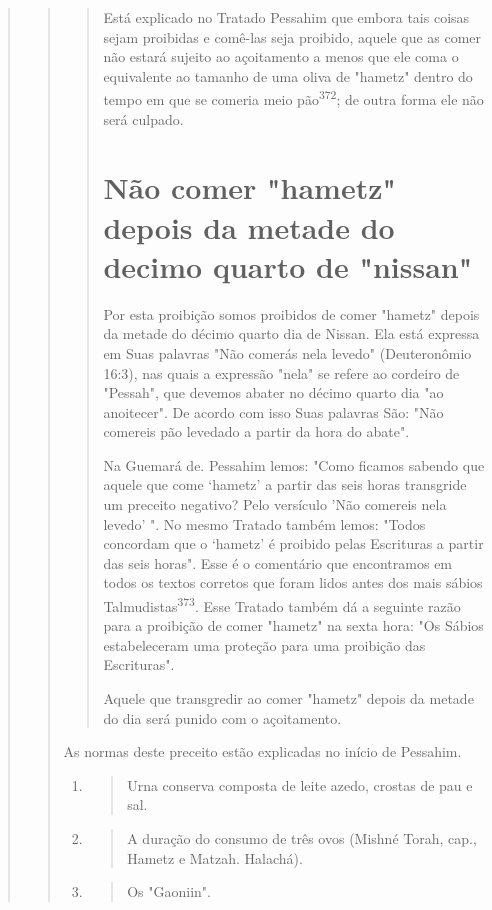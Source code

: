 \begin{quote}
\begin{quote}
\begin{quote}
Está explicado no Tratado Pessahim que embora tais coisas sejam
proibidas e comê-las seja proibido, aquele que as comer não estará
sujeito ao açoitamento a menos que ele coma o equivalente ao tamanho de
uma oliva de "hametz" dentro do tempo em que se comeria meio
pão\textsuperscript{372}; de outra forma ele não será culpado.

\section{Não comer "hametz" depois da metade do decimo quarto de "nissan"}

Por esta proibição somos proibidos de comer "hametz" depois da metade do
décimo quarto dia de Nissan. Ela está expressa em Suas palavras "Não
comerás nela levedo" (Deuteronômio 16:3), nas quais a expressão "nela"
se refere ao cordeiro de "Pessah", que devemos abater no décimo quarto
dia "ao anoitecer". De acordo com isso Suas palavras São: "Não comereis
pão leveda­do a partir da hora do abate".

Na Guemará de. Pessahim lemos: "Como ficamos sabendo que aque­le que
come `hametz' a partir das seis horas transgride um preceito negativo?
Pelo versículo 'Não comereis nela levedo' ". No mesmo Tratado também
le­mos: "Todos concordam que o `hametz' é proibido pelas Escrituras a
partir das seis horas". Esse é o comentário que encontramos em todos os
textos corretos que foram lidos antes dos mais sábios
Talmudistas\textsuperscript{373}. Esse Tratado também dá a seguinte
razão para a proibição de comer "hametz" na sexta hora: "Os Sábios
estabeleceram uma proteção para uma proibição das Escrituras".

Aquele que transgredir ao comer "hametz" depois da metade do dia será
punido com o açoitamento.
\end{quote}

As normas deste preceito estão explicadas no início de Pessahim.

\begin{enumerate}
\def\labelenumi{\arabic{enumi}.}
\setcounter{enumi}{370}
\item
 \begin{quote}
 Urna conserva composta de leite azedo, crostas de pau e sal.
 \end{quote}
\item
 \begin{quote}
 A duração do consumo de três ovos (Mishné Torah, cap., Hametz e
 Matzah. Halachá).
 \end{quote}
\item
 \begin{quote}
 Os "Gaoniin".
 \end{quote}
\end{enumerate}


\end{quote}
\end{quote}
